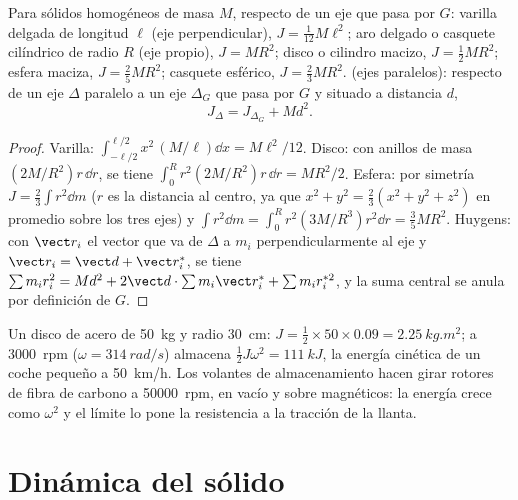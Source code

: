\begin{proposition}\label{prop:b2:rigid-body-mechanics:inertia}
Para sólidos homogéneos de masa $M$, respecto de un eje que pasa por $G$:
varilla delgada de longitud $\ell$ (eje perpendicular), $J = \tfrac1{12}M\ell^2$;
aro delgado o casquete cilíndrico de radio $R$ (eje propio), $J = MR^2$;
disco o cilindro macizo, $J = \tfrac12MR^2$; esfera maciza, $J = \tfrac25MR^2$;
casquete esférico, $J = \tfrac23MR^2$. \emph{} (ejes
paralelos): respecto de un eje $\Delta$ paralelo a un eje $\Delta_G$ que
pasa por $G$ y situado a distancia $d$,
\[
J_\Delta = J_{\Delta_G} + Md^2 .
\]
\end{proposition}

\begin{proof}
Varilla: $\int_{-\ell/2}^{\ell/2}x^2\,(M/\ell)\dd x = M\ell^2/12$. Disco: con
anillos de masa $(2M/R^2)r\,\dd r$, se tiene
$\int_0^R r^2(2M/R^2)r\,\dd r = MR^2/2$.
Esfera: por simetría $J = \tfrac23\int r^2\dd m$ ($r$ es la distancia al
centro, ya que $x^2 + y^2 = \tfrac23(x^2 + y^2 + z^2)$ en promedio sobre los
tres ejes) y $\int r^2\dd m = \int_0^R r^2(3M/R^3)r^2\dd r = \tfrac35MR^2$.
Huygens: con $\vect r_i$ el vector que va de $\Delta$ a $m_i$
perpendicularmente al eje y $\vect r_i = \vect d + \vect r_i^*$, se tiene
$\sum m_ir_i^2 = Md^2
+ 2\vect d\cdot\sum m_i\vect r_i^* + \sum m_ir_i^{*2}$, y la suma central
se anula por definición de $G$.
\end{proof}

\begin{example}\label{ex:b2:rigid-body-mechanics:flywheel}
Un disco de acero de \qty{50}{kg} y radio \qty{30}{cm}: $J = \tfrac12 \times
50 \times 0.09 = \qty{2.25}{kg.m^2}$; a \qty{3000}{rpm} ($\omega =
\qty{314}{rad/s}$) almacena $\tfrac12J\omega^2 = \qty{111}{kJ}$, la energía
cinética de un coche pequeño a \qty{50}{km/h}. Los volantes de
almacenamiento hacen girar rotores de fibra de carbono a \qty{50000}{rpm},
en vacío y sobre  magnéticos: la energía crece como $\omega^2$ y
el límite lo pone la resistencia a la tracción de la llanta.
\end{example}

\section{Dinámica del sólido}

